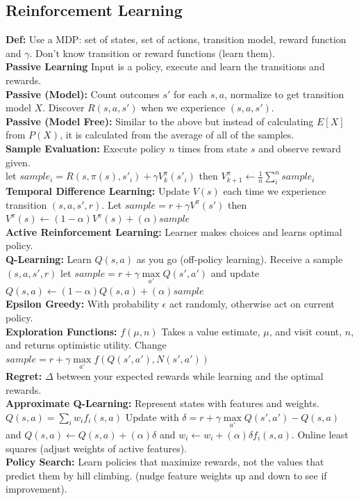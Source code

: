 \documentclass[10pt, a4paper]{article}
\begin{document}
    \begin{multicols*}{1}
        \section*{Reinforcement Learning}
            \textbf{Def:} Use a MDP: set of states, set of actions, transition model, reward function and $\gamma$. Don't know transition or reward functions (learn them).\\
            \textbf{Passive Learning} Input is a policy, execute and learn the transitions and rewards.\\
            \textbf{Passive (Model):} Count outcomes $s'$ for each $s, a$, normalize to get transition model $X$. Discover $R(s, a, s')$ when we experience $(s, a, s')$.\\
            \textbf{Passive (Model Free):} Similar to the above but instead of calculating $E[X]$ from $P(X)$, it is calculated from the average of all of the samples.\\
            \textbf{Sample Evaluation:} Execute policy $n$ times from state $s$ and observe reward given. \\let $sample_i = R(s, \pi(s), s'_i) + \gamma V_k^\pi (s'_i)$ then $V_{k+1}^\pi \leftarrow \frac{1}{n} \sum\limits_i^n sample_i$\\
            \textbf{Temporal Difference Learning:} Update $V(s)$ each time we experience transition $(s, a, s', r)$. Let $sample = r + \gamma V^\pi (s')$ then $V^\pi(s) \leftarrow (1 - \alpha)V^\pi(s) + (\alpha) sample$\\
            \textbf{Active Reinforcement Learning:} Learner makes choices and learns optimal policy.\\
            \textbf{Q-Learning:} Learn $Q(s, a)$ as you go (off-policy learning). Receive a sample $(s, a, s', r)$ let $sample = r + \gamma \max\limits_{a'} Q(s', a')$ and update $Q(s, a) \leftarrow (1 - \alpha) Q(s, a) + (\alpha) sample$\\
            \textbf{Epsilon Greedy:} With probability $\epsilon$ act randomly, otherwise act on current policy.\\
            \textbf{Exploration Functions:} $f(\mu, n)$ Takes a value estimate, $\mu$, and visit count, $n$, and returns optimistic utility. Change $sample = r + \gamma \max\limits_{a'}f(Q(s', a'), N(s', a'))$\\
            \textbf{Regret:} $\Delta$ between your expected rewards while learning and the optimal rewards.\\
            \textbf{Approximate Q-Learning:} Represent states with features and weights. $Q(s, a) = \sum\limits_i w_i f_i(s, a)$ Update with $\delta = r + \gamma \max\limits_{a'} Q(s', a') - Q(s, a)$ and $Q(s, a) \leftarrow Q(s, a) + (\alpha) \delta$ and $w_i \leftarrow w_i + (\alpha) \delta f_i(s, a)$. Online least squares (adjust weights of active features).\\
            \textbf{Policy Search:} Learn policies that maximize rewards, not the values that predict them by hill climbing. (nudge feature weights up and down to see if improvement).

\end{multicols*}
\end{document}

